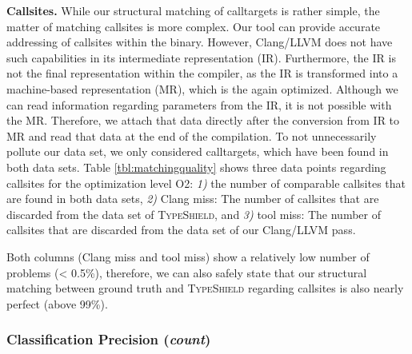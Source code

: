 \textbf{Callsites.} While our structural matching of calltargets is rather simple, the matter of matching callsites is more complex. Our tool can provide accurate addressing of callsites within the binary. 
However, Clang/LLVM does not have such capabilities in its intermediate representation (IR). Furthermore, the IR is not the final representation within the compiler, as the IR is transformed into a machine-based representation (MR), which is the again optimized. Although we can read information regarding parameters from the IR, it is not possible with the MR. 
Therefore, we attach that data directly after the conversion from IR to MR and read that data at the end of the compilation. To not unnecessarily pollute our data set, we only considered calltargets, which have been found in both data sets. 
Table \ref{tbl:matchingquality} shows three data points regarding callsites for the optimization level O2:
\textit{1)} the number of comparable callsites that are found in both data sets,
\textit{2)} Clang miss: The number of callsites that are discarded from the data set of \textsc{TypeShield}, and
\textit{3)} tool miss: The number of callsites that are discarded from the data set of our Clang/LLVM pass.

Both columns (Clang miss and tool miss) show a relatively low number of problems (< 0.5\%), therefore, we can also 
safely state that our structural matching between ground truth and \textsc{TypeShield} regarding callsites is also nearly perfect (above 99\%).

\subsubsection{Classification Precision (\textit{count})}
\label{subsection:typeshieldcountprecision}

